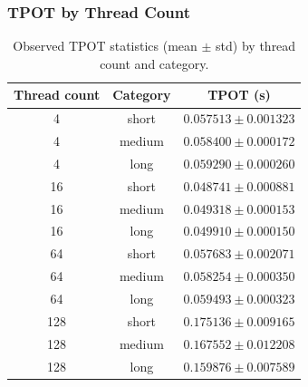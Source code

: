 \documentclass[11pt,a4paper]{article}
\begin{document}
    \subsubsection{TPOT by Thread Count}
    \begin{table}[H]
    \centering
    \small
    \setlength{\tabcolsep}{4pt}
    \begin{tabularx}{\textwidth}{c|c|c}
        \toprule
        Thread count & Category & TPOT (s) \\
        \midrule
        4   & short  & $0.057513 \pm 0.001323$ \\
        4   & medium & $0.058400 \pm 0.000172$ \\
        4   & long   & $0.059290 \pm 0.000260$ \\
        16  & short  & $0.048741 \pm 0.000881$ \\
        16  & medium & $0.049318 \pm 0.000153$ \\
        16  & long   & $0.049910 \pm 0.000150$ \\
        64  & short  & $0.057683 \pm 0.002071$ \\
        64  & medium & $0.058254 \pm 0.000350$ \\
        64  & long   & $0.059493 \pm 0.000323$ \\
        128 & short  & $0.175136 \pm 0.009165$ \\
        128 & medium & $0.167552 \pm 0.012208$ \\
        128 & long   & $0.159876 \pm 0.007589$ \\
        \bottomrule
    \end{tabularx}
    \caption{Observed TPOT statistics (mean $\pm$ std) by thread count and category.}
    \label{tab:model_deepdive_tpot_thread_count}
    \end{table}
\end{document}
